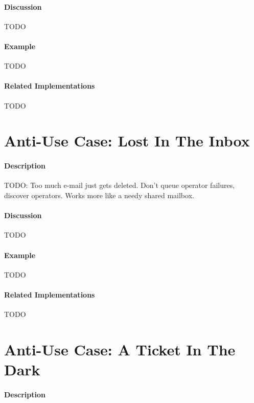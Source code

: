\paragraph{Discussion}

{\Large TODO}

\paragraph{Example}

{\Large TODO}

\paragraph{Related Implementations}

{\Large TODO}

\section{Anti-Use Case: Lost In The Inbox}

\paragraph{Description}

{\Large TODO:} Too much e-mail just gets deleted.  Don't queue operator failures, discover operators.  Works more like a needy shared mailbox.

\paragraph{Discussion}

{\Large TODO}

\paragraph{Example}

{\Large TODO}

\paragraph{Related Implementations}

{\Large TODO}

\section{Anti-Use Case: A Ticket In The Dark}

\paragraph{Description}

